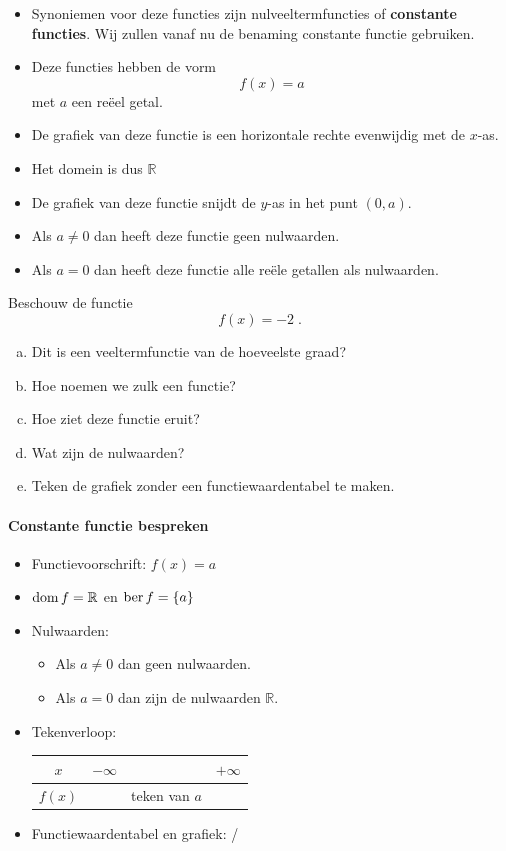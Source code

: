 \documentclass[12pt,twoside,a4paper]{article}
\begin{document}
\begin{itemize}
\item Synoniemen voor deze functies zijn nulveeltermfuncties of {\bf constante functies}. Wij zullen vanaf nu de benaming constante functie gebruiken.
\item Deze functies hebben de vorm
  $$f(x) = a$$
  met $a$ een reëel getal.
\item De grafiek van deze functie is een horizontale rechte evenwijdig met de $x$-as.
\item Het domein is dus $\mathbb{R}$
\item De grafiek van deze functie snijdt de $y$-as in het punt $(0, a)$.
\item Als $a\neq 0$ dan heeft deze functie geen nulwaarden.
\item Als $a=0$ dan heeft deze functie alle reële getallen als nulwaarden.
\end{itemize}

\begin{oefening}
  Beschouw de functie
  $$f(x)=-2\;.$$
  \begin{enumerate}[(a)]
  \item Dit is een veeltermfunctie van de hoeveelste graad?
  \item Hoe noemen we zulk een functie?
  \item Hoe ziet deze functie eruit?
  \item Wat zijn de nulwaarden?
  \item Teken de grafiek zonder een functiewaardentabel te maken.
  \end{enumerate}
\end{oefening}

\paragraph*{Constante functie bespreken}
\begin{mdframed}
  \begin{itemize}
  \item Functievoorschrift: $f(x)=a$
  \item $\dom f = \mathbb{R}$ en $\ber f = \{a\}$
  \item Nulwaarden:
    \begin{itemize}
    \item Als $a\neq 0$ dan geen nulwaarden.
    \item Als $a=0$ dan zijn de nulwaarden $\mathbb{R}$.
    \end{itemize}
  \item Tekenverloop:
    \begin{center}
      \begin{tabular}{c|lcr}
        $x$ & $-\infty$ & & $+\infty$\\
        \hline
        $f(x)$ & & teken van $a$ &
      \end{tabular}
    \end{center}
  \item Functiewaardentabel en grafiek: /
  \end{itemize}
\end{mdframed}
\end{document}
